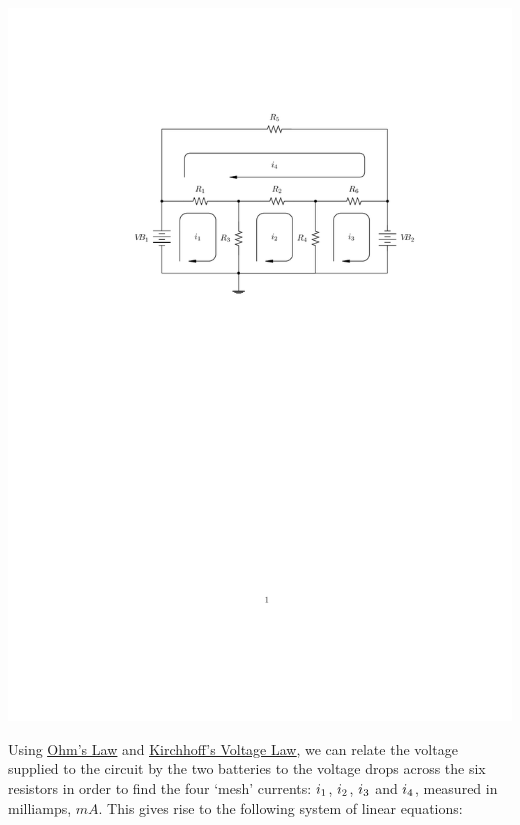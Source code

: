 \centerline{\includegraphics{./NonLinearInequalitiesGraphics/CircuitDiagram01.pdf}}

Using \href{http://en.wikipedia.org/wiki/Ohm's_law}{\underline{Ohm's Law}}   and \href{http://en.wikipedia.org/wiki/Kirchhoff's_circuit_laws}{\underline{Kirchhoff's Voltage Law}}, we can relate the voltage supplied to the circuit by the two batteries to the voltage drops across the six resistors in order to find the four `mesh' currents: $i_{\text{\scriptsize$1$}}$, $i_{\text{\scriptsize$2$}}$, $i_{\text{\scriptsize$3$}}$ and $i_{\text{\scriptsize$4$}}$, measured in milliamps, $mA$. This gives rise to the following system of linear equations:


